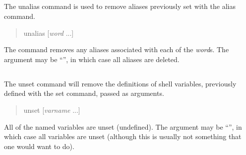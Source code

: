 \subsection{}


The {\cb unalias} command is used to remove aliases previously set with
the {\cb alias} command.
\begin{quote}\vt
unalias [{\it word} ...]
\end{quote}
The command removes any aliases associated with each of the {\it
word\/}s.  The argument may be ``{\vt *}'', in which case all aliases
are deleted.

\subsection{}


The {\cb unset} command will remove the definitions of shell
variables, previously defined with the {\cb set} command, passed as
arguments.
\begin{quote}\vt
unset [{\it varname} ...]
\end{quote}
All of the named variables are unset (undefined).  The argument may be
``{\vt *}'', in which case all variables are unset (although this is
usually not something that one would want to do).

\subsection{}



